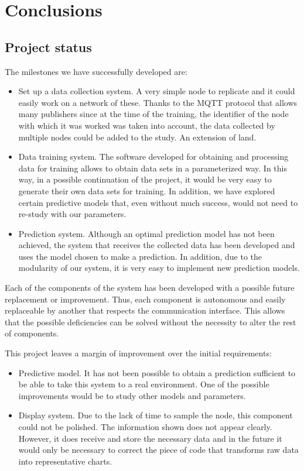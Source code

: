 \cleardoublepage

\chapter{Conclusions}
\label{makereference9}

\section{Project status}

The milestones we have successfully developed are:
\begin{itemize}
\item Set up a data collection system. A very simple node to replicate and it could easily work on a network of these. Thanks to the MQTT protocol that allows many publishers since at the time of the training, the identifier of the node with which it was worked was taken into account, the data collected by multiple nodes could be added to the study. An extension of land.

\item Data training system. The software developed for obtaining and processing data for training allows to obtain data sets in a parameterized way. In this way, in a possible continuation of the project, it would be very easy to generate their own data sets for training. In addition, we have explored certain predictive models that, even without much success, would not need to re-study with our parameters.

\item Prediction system. Although an optimal prediction model has not been achieved, the system that receives the collected data has been developed and uses the model chosen to make a prediction. In addition, due to the modularity of our system, it is very easy to implement new prediction models.
\end{itemize}

Each of the components of the system has been developed with a possible future replacement or improvement. Thus, each component is autonomous and easily replaceable by another that respects the communication interface. This allows that the possible deficiencies can be solved without the necessity to alter the rest of components.

This project leaves a margin of improvement over the initial requirements:

\begin{itemize}
\item Predictive model. It has not been possible to obtain a prediction sufficient to be able to take this system to a real environment. One of the possible improvements would be to study other models and parameters.

\item Display system. Due to the lack of time to sample the node, this component could not be polished. The information shown does not appear clearly. However, it does receive and store the necessary data and in the future it would only be necessary to correct the piece of code that transforms raw data into representative charts.
\end{itemize}

